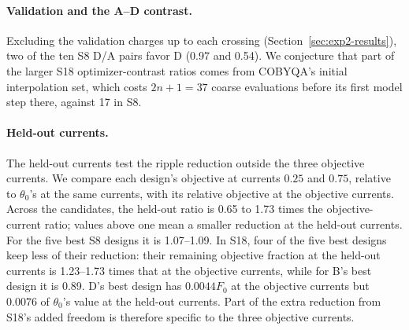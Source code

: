 \documentclass{anvil-paper}
\begin{document}
\paragraph{Validation and the A--D contrast.}
Excluding the validation charges up to each crossing
(Section~\ref{sec:exp2-results}), two of the ten S8 D/A pairs favor D
(0.97 and 0.54). We conjecture that part of the larger
S18 optimizer-contrast ratios comes from COBYQA's initial interpolation set, which costs
$2n+1=37$ coarse evaluations before its first model step there, against
17 in S8.

\paragraph{Held-out currents.}
The held-out currents test the ripple reduction outside the three objective
currents. We compare each design's objective at currents $0.25$ and $0.75$,
relative to $\theta_0$'s at the same currents, with its relative objective
at the objective currents. Across the candidates, the held-out ratio is 0.65
to 1.73 times the objective-current ratio; values above one mean a smaller
reduction at the held-out currents. For the five best S8 designs it
is 1.07--1.09. In S18, four of the five best designs keep less of
their reduction: their remaining objective fraction at the held-out currents
is 1.23--1.73 times that at the objective currents, while for B's best
design it is 0.89. D's best design has $0.0044F_0$ at the objective currents but
$0.0076$ of $\theta_0$'s value at the held-out currents. Part of the extra
reduction from S18's added freedom is therefore specific to the three
objective currents.

\begin{table}[tbp]\centering\small
\caption{Validation charges, repeat~1. ``To crossing'' counts the
validations up to and including the first attaining one, and ``share''
gives the fraction of the time to that target charged to validation, as
medians (ranges) over the method's attained targets and starts. ``Run''
gives the range over starts of the fraction of the whole run's charged time
spent in validation.}
\label{tab:exp2-validation}
\end{table}
\end{document}
